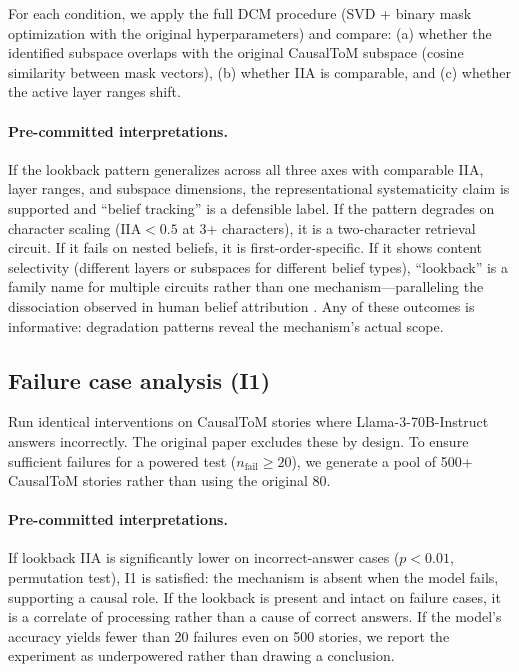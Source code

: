 \documentclass{article}
\begin{document}
For each condition, we apply the full DCM procedure (SVD + binary mask optimization with the original hyperparameters) and compare: (a) whether the identified subspace overlaps with the original CausalToM subspace (cosine similarity between mask vectors), (b) whether IIA is comparable, and (c) whether the active layer ranges shift.

\paragraph{Pre-committed interpretations.} If the lookback pattern generalizes across all three axes with comparable IIA, layer ranges, and subspace dimensions, the representational systematicity claim is supported and ``belief tracking'' is a defensible label. If the pattern degrades on character scaling ($\text{IIA} < 0.5$ at 3+ characters), it is a two-character retrieval circuit. If it fails on nested beliefs, it is first-order-specific. If it shows content selectivity (different layers or subspaces for different belief types), ``lookback'' is a family name for multiple circuits rather than one mechanism---paralleling the dissociation observed in human belief attribution \citep{apperly2009humans}. Any of these outcomes is informative: degradation patterns reveal the mechanism's actual scope.

\subsection{Failure case analysis (I1)}
\label{sec:failure}

Run identical interventions on CausalToM stories where Llama-3-70B-Instruct answers incorrectly. The original paper excludes these by design. To ensure sufficient failures for a powered test ($n_{\text{fail}} \geq 20$), we generate a pool of 500+ CausalToM stories rather than using the original 80.

\paragraph{Pre-committed interpretations.} If lookback IIA is significantly lower on incorrect-answer cases ($p < 0.01$, permutation test), I1 is satisfied: the mechanism is absent when the model fails, supporting a causal role. If the lookback is present and intact on failure cases, it is a correlate of processing rather than a cause of correct answers. If the model's accuracy yields fewer than 20 failures even on 500 stories, we report the experiment as underpowered rather than drawing a conclusion.
\end{document}

